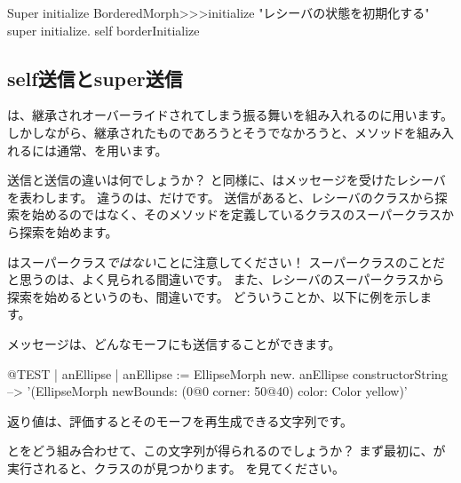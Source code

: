 \documentclass[a4paper,10pt,twoside]{book}
\begin{document}
\begin{method}[morphinit]{Super initialize}
BorderedMorph>>>initialize
	"レシーバの状態を初期化する"
	super initialize.
	self borderInitialize
\end{method}


\subsection{self送信とsuper送信}

\super{}は、継承されオーバーライドされてしまう振る舞いを組み入れるのに用います。
しかしながら、継承されたものであろうとそうでなかろうと、メソッドを組み入れるには通常、\self{}を用います。

\self 送信と\super 送信の違いは何でしょうか？ 
\self と同様に、\super はメッセージを受けたレシーバを表わします。
違うのは、だけです。
\super 送信があると、レシーバのクラスから探索を始めるのではなく、そのメソッドを定義しているクラスのスーパークラスから探索を始めます。

\super はスーパークラス\emph{ではない}ことに注意してください！
スーパークラスのことだと思うのは、よく見られる間違いです。
また、レシーバのスーパークラスから探索を始めるというのも、間違いです。
どういうことか、以下に例を示します。

メッセージは、どんなモーフにも送信することができます。
\begin{code}{@TEST | anEllipse | anEllipse := EllipseMorph new.}
anEllipse constructorString --> '(EllipseMorph newBounds: (0@0 corner: 50@40) color: Color yellow)'
\end{code}
返り値は、評価するとそのモーフを再生成できる文字列です。

\self と\super をどう組み合わせて、この文字列が得られるのでしょうか？
まず最初に、が実行されると、クラスのが見つかります。
を見てください。
\end{document}
